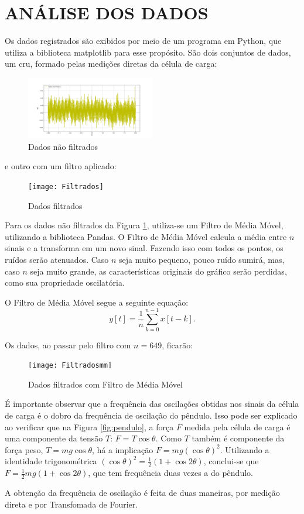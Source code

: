 \documentclass[10pt,a4paper,twocolumn]{article}
\begin{document}
\section{ANÁLISE DOS DADOS}
\par Os dados registrados são exibidos por meio de um programa em Python, que utiliza a biblioteca matplotlib para esse propósito. São dois conjuntos de dados, um cru, formado pelas medições diretas da célula de carga:
\begin{figure}[H]
\includegraphics[width=0.5\textwidth, left]{NãoFiltrados}
\caption{Dados não filtrados}
\label{fig:naofiltrados}
\end{figure}
e outro com um filtro aplicado:
\begin{figure}[H]
\texttt{[image: Filtrados]}
\caption{Dados filtrados}
\end{figure}
\par Para os dados não filtrados da Figura \ref{fig:naofiltrados}, utiliza-se um Filtro de Média Móvel, utilizando a biblioteca Pandas. O Filtro de Média Móvel calcula a média entre $n$ sinais e a transforma em um novo sinal. Fazendo isso com todos os pontos, os ruídos serão atenuados. Caso $n$ seja muito pequeno, pouco ruído sumirá, mas, caso $n$ seja muito grande, as características originais do gráfico serão perdidas, como sua propriedade oscilatória. 
\par O Filtro de Média Móvel segue a seguinte equação:
\begin{equation}
y[t]=\frac{1}{n}\sum_{k=0}^{n-1}x[t-k].
\end{equation}
\par Os dados, ao passar pelo filtro com $n=649$, ficarão: 
\begin{figure}[H]
\texttt{[image: Filtradosmm]}
\caption{Dados filtrados com Filtro de Média Móvel}
\label{fig:filtradosmm}
\end{figure}
É importante observar que a frequência das oscilações obtidas nos sinais da célula de carga é o dobro da frequência de oscilação do pêndulo. Isso pode ser explicado ao verificar que na Figura \ref{fig:pendulo}, a força $F$ medida pela célula de carga é uma componente da tensão $T$: $F=T\cos\theta$. Como $T$ também é componente da força peso, $T=mg\cos\theta$, há a implicação $F=mg(\cos\theta)^2$. Utilizando a identidade trigonométrica $(\cos\theta)^2=\frac{1}{2}(1+\cos2\theta)$, conclui-se que $F=\frac{1}{2}mg(1+\cos2\theta)$, que tem frequência duas vezes a do pêndulo.
\par A obtenção da frequência de oscilação é feita de duas maneiras, por medição direta e por Transfomada de Fourier.
\end{document}
